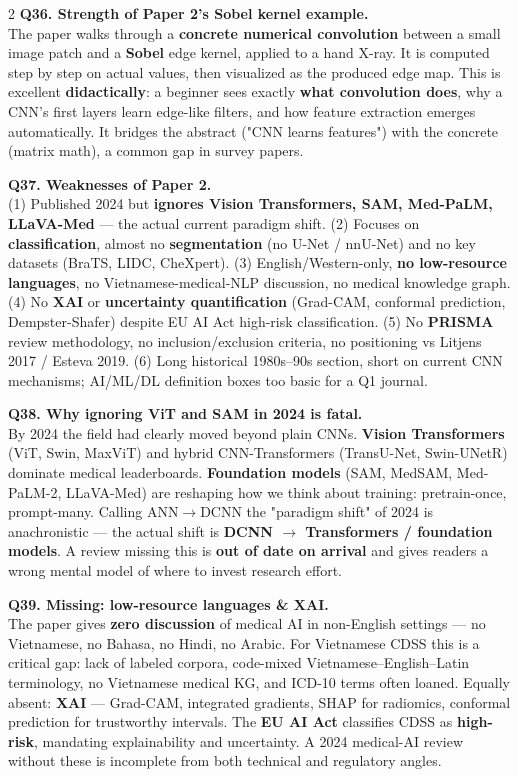 \begin{paracol}{2}
\textbf{Q36. Strength of Paper 2's Sobel kernel example.}\\
The paper walks through a \textbf{concrete numerical convolution} between a small image patch and a \textbf{Sobel} edge kernel, applied to a hand X-ray. It is computed step by step on actual values, then visualized as the produced edge map. This is excellent \textbf{didactically}: a beginner sees exactly \textbf{what convolution does}, why a CNN's first layers learn edge-like filters, and how feature extraction emerges automatically. It bridges the abstract ("CNN learns features") with the concrete (matrix math), a common gap in survey papers.

\textbf{Q37. Weaknesses of Paper 2.}\\
(1) Published 2024 but \textbf{ignores Vision Transformers, SAM, Med-PaLM, LLaVA-Med} — the actual current paradigm shift. (2) Focuses on \textbf{classification}, almost no \textbf{segmentation} (no U-Net / nnU-Net) and no key datasets (BraTS, LIDC, CheXpert). (3) English/Western-only, \textbf{no low-resource languages}, no Vietnamese-medical-NLP discussion, no medical knowledge graph. (4) No \textbf{XAI} or \textbf{uncertainty quantification} (Grad-CAM, conformal prediction, Dempster-Shafer) despite EU AI Act high-risk classification. (5) No \textbf{PRISMA} review methodology, no inclusion/exclusion criteria, no positioning vs Litjens 2017 / Esteva 2019. (6) Long historical 1980s--90s section, short on current CNN mechanisms; AI/ML/DL definition boxes too basic for a Q1 journal.

\textbf{Q38. Why ignoring ViT and SAM in 2024 is fatal.}\\
By 2024 the field had clearly moved beyond plain CNNs. \textbf{Vision Transformers} (ViT, Swin, MaxViT) and hybrid CNN-Transformers (TransU-Net, Swin-UNetR) dominate medical leaderboards. \textbf{Foundation models} (SAM, MedSAM, Med-PaLM-2, LLaVA-Med) are reshaping how we think about training: pretrain-once, prompt-many. Calling ANN$\to$DCNN the "paradigm shift" of 2024 is anachronistic — the actual shift is \textbf{DCNN $\to$ Transformers / foundation models}. A review missing this is \textbf{out of date on arrival} and gives readers a wrong mental model of where to invest research effort.

\textbf{Q39. Missing: low-resource languages \& XAI.}\\
The paper gives \textbf{zero discussion} of medical AI in non-English settings — no Vietnamese, no Bahasa, no Hindi, no Arabic. For Vietnamese CDSS this is a critical gap: lack of labeled corpora, code-mixed Vietnamese--English--Latin terminology, no Vietnamese medical KG, and ICD-10 terms often loaned. Equally absent: \textbf{XAI} — Grad-CAM, integrated gradients, SHAP for radiomics, conformal prediction for trustworthy intervals. The \textbf{EU AI Act} classifies CDSS as \textbf{high-risk}, mandating explainability and uncertainty. A 2024 medical-AI review without these is incomplete from both technical and regulatory angles.


\end{paracol}
